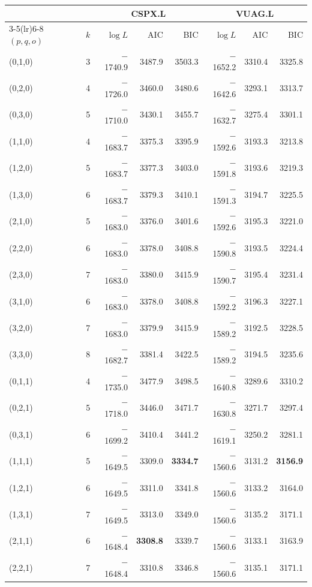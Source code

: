 \begin{tabular}{lrrrrrrr}
\toprule
 & & \multicolumn{3}{c}{CSPX.L} & \multicolumn{3}{c}{VUAG.L} \\
\cmidrule(lr){3-5}\cmidrule(lr){6-8}
$(p,q,o)$ & $k$ & $\log L$ & AIC & BIC & $\log L$ & AIC & BIC \\
\midrule
(0,1,0) & 3 & $-$1740.9 & 3487.9 & 3503.3 & $-$1652.2 & 3310.4 & 3325.8 \\
(0,2,0) & 4 & $-$1726.0 & 3460.0 & 3480.6 & $-$1642.6 & 3293.1 & 3313.7 \\
(0,3,0) & 5 & $-$1710.0 & 3430.1 & 3455.7 & $-$1632.7 & 3275.4 & 3301.1 \\
(1,1,0) & 4 & $-$1683.7 & 3375.3 & 3395.9 & $-$1592.6 & 3193.3 & 3213.8 \\
(1,2,0) & 5 & $-$1683.7 & 3377.3 & 3403.0 & $-$1591.8 & 3193.6 & 3219.3 \\
(1,3,0) & 6 & $-$1683.7 & 3379.3 & 3410.1 & $-$1591.3 & 3194.7 & 3225.5 \\
(2,1,0) & 5 & $-$1683.0 & 3376.0 & 3401.6 & $-$1592.6 & 3195.3 & 3221.0 \\
(2,2,0) & 6 & $-$1683.0 & 3378.0 & 3408.8 & $-$1590.8 & 3193.5 & 3224.4 \\
(2,3,0) & 7 & $-$1683.0 & 3380.0 & 3415.9 & $-$1590.7 & 3195.4 & 3231.4 \\
(3,1,0) & 6 & $-$1683.0 & 3378.0 & 3408.8 & $-$1592.2 & 3196.3 & 3227.1 \\
(3,2,0) & 7 & $-$1683.0 & 3379.9 & 3415.9 & $-$1589.2 & 3192.5 & 3228.5 \\
(3,3,0) & 8 & $-$1682.7 & 3381.4 & 3422.5 & $-$1589.2 & 3194.5 & 3235.6 \\
\addlinespace
(0,1,1) & 4 & $-$1735.0 & 3477.9 & 3498.5 & $-$1640.8 & 3289.6 & 3310.2 \\
(0,2,1) & 5 & $-$1718.0 & 3446.0 & 3471.7 & $-$1630.8 & 3271.7 & 3297.4 \\
(0,3,1) & 6 & $-$1699.2 & 3410.4 & 3441.2 & $-$1619.1 & 3250.2 & 3281.1 \\
(1,1,1) & 5 & $-$1649.5 & 3309.0 & \textbf{3334.7} & $-$1560.6 & 3131.2 & \textbf{3156.9} \\
(1,2,1) & 6 & $-$1649.5 & 3311.0 & 3341.8 & $-$1560.6 & 3133.2 & 3164.0 \\
(1,3,1) & 7 & $-$1649.5 & 3313.0 & 3349.0 & $-$1560.6 & 3135.2 & 3171.1 \\
(2,1,1) & 6 & $-$1648.4 & \textbf{3308.8} & 3339.7 & $-$1560.6 & 3133.1 & 3163.9 \\
(2,2,1) & 7 & $-$1648.4 & 3310.8 & 3346.8 & $-$1560.6 & 3135.1 & 3171.1 \\

\end{tabular}
